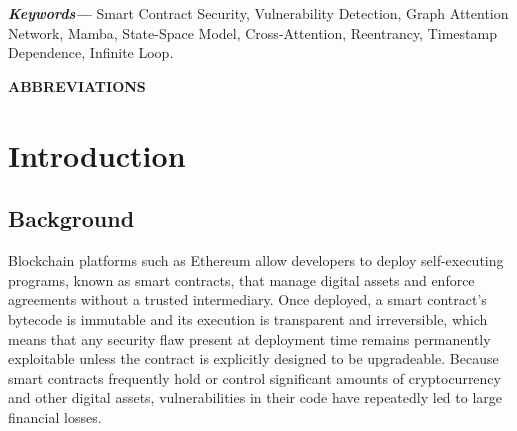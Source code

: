 \documentclass[12pt, a4paper, openright, twoside]{report}
\providecommand{\keywords}[1]{\textbf{\textit{Keywords---}} #1}
\begin{document}
\hspace{1cm}
\null
\\
\\
\keywords{Smart Contract Security, Vulnerability Detection, Graph Attention Network, Mamba, State-Space Model, Cross-Attention, Reentrancy, Timestamp Dependence, Infinite Loop.}

\renewcommand*{\contentsname}{\MakeUppercase{Contents}}
\renewcommand*{\listfigurename}{\MakeUppercase{List of Figures}}
\renewcommand*{\listtablename}{\MakeUppercase{List of Tables}}
\renewcommand{\bibname}{REFERENCES}
\thispagestyle{}
\setcounter{page}{1}
\clearpage
{}
\tableofcontents
\clearpage
{}
\listoffigures
\clearpage
\begingroup
\let\clearpage\relax
\null
\null
\null
{}
\listoftables
\endgroup
\cleardoublepage
{}
\begin{center}

\textbf{{\huge ABBREVIATIONS}}


\end{center}
\null
\restoregeometry

\cleardoublepage
{}


\chapter{Introduction}

\setcounter{page}{1}

\section{Background}

Blockchain platforms such as Ethereum allow developers to deploy self-executing programs, known as smart contracts, that manage digital assets and enforce agreements without a trusted intermediary. Once deployed, a smart contract's bytecode is immutable and its execution is transparent and irreversible, which means that any security flaw present at deployment time remains permanently exploitable unless the contract is explicitly designed to be upgradeable. Because smart contracts frequently hold or control significant amounts of cryptocurrency and other digital assets, vulnerabilities in their code have repeatedly led to large financial losses.
\end{document}
